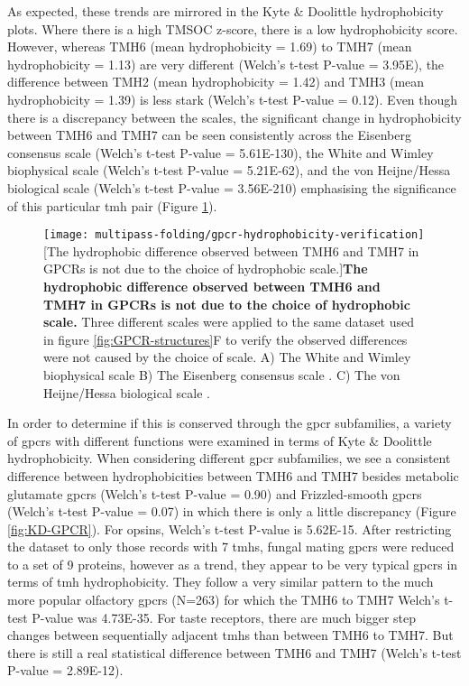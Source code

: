 As expected, these trends are mirrored in the Kyte \& Doolittle \cite{Kyte1982} hydrophobicity plots.
Where there is a high TMSOC z\--score, there is a low hydrophobicity score.
However, whereas TMH6 (mean hydrophobicity = 1.69) to TMH7 (mean hydrophobicity = 1.13) are very different (Welch's t\--test P\--value = 3.95E), the difference between TMH2 (mean hydrophobicity = 1.42) and TMH3 (mean hydrophobicity = 1.39) is less stark (Welch's t\--test P\--value = 0.12).
Even though there is a discrepancy between the scales, the significant change in hydrophobicity  between TMH6 and TMH7 can be seen consistently across the Eisenberg consensus scale \cite{Eisenberg1984} (Welch's t\--test P\--value = 5.61E-130), the White and Wimley biophysical scale \cite{White1999} (Welch's t\--test P\--value = 5.21E-62), and the von Heijne/Hessa biological scale \cite{Hessa2005} (Welch's t\--test P\--value = 3.56E-210) emphasising the significance of this particular \gls{tmh} pair (Figure \ref{fig:gpcr-hydrophobicity-verification}).

\begin{figure}[!ht]
\centering
\texttt{[image: multipass-folding/gpcr-hydrophobicity-verification]}
		[The hydrophobic difference observed between TMH6 and TMH7 in GPCRs is not due to the choice of hydrophobic scale.]{\textbf{The hydrophobic difference observed between TMH6 and TMH7 in GPCRs is not due to the choice of hydrophobic scale.}
    Three different scales were applied to the same dataset used in figure \ref{fig:GPCR-structures}F to verify the observed differences were not caused by the choice of scale.
    A) The White and Wimley biophysical scale \cite{White1999}
    B) The Eisenberg consensus scale \cite{Eisenberg1984}.
    C) The von Heijne/Hessa biological scale \cite{Hessa2005}.}

\label{fig:gpcr-hydrophobicity-verification}
\end{figure}

In order to determine if this is conserved through the \gls{gpcr} subfamilies, a variety of \gls{gpcr}s with different functions were examined in terms of Kyte \& Doolittle hydrophobicity.
When considering different \gls{gpcr} subfamilies, we see a consistent difference between hydrophobicities between TMH6 and TMH7 besides metabolic glutamate \gls{gpcr}s (Welch's t\--test P\--value = 0.90) and Frizzled-smooth \gls{gpcr}s (Welch's t\--test P\--value = 0.07) in which there is only a little discrepancy (Figure \ref{fig:KD-GPCR}).
For opsins, Welch's t\--test P\--value is 5.62E-15.
After restricting the dataset to only those records with 7 \gls{tmh}s, fungal mating \gls{gpcr}s were reduced to a set of 9 proteins, however as a trend, they appear to be very typical \gls{gpcr}s in terms of \gls{tmh} hydrophobicity.
They follow a very similar pattern to the much more popular olfactory \gls{gpcr}s (N=263) for which the TMH6 to TMH7 Welch's t\--test P\--value was 4.73E-35.
For taste receptors, there are much bigger step changes between sequentially adjacent \gls{tmh}s than between TMH6 to TMH7.
But there is still a real statistical difference between TMH6 and TMH7 (Welch's t\--test P\--value = 2.89E-12).

